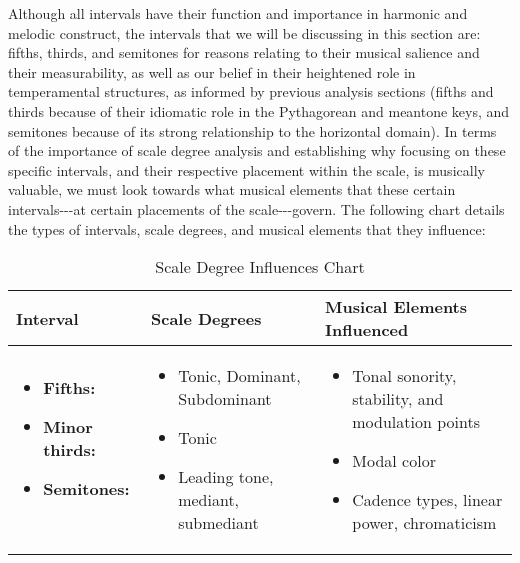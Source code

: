 Although all intervals have their function and importance in harmonic
and melodic construct, the intervals that we will be discussing in this
section are: fifths, thirds, and semitones for reasons relating to their
musical salience and their measurability, as well as our belief in their
heightened role in temperamental structures, as informed by previous
analysis sections (fifths and thirds because of their idiomatic role in
the Pythagorean and meantone keys, and semitones because of its strong
relationship to the horizontal domain). In terms of the importance of
scale degree analysis and establishing why focusing on these specific
intervals, and their respective placement within the scale, is musically
valuable, we must look towards what musical elements that these certain
intervals-\/-\/-at certain placements of the scale-\/-\/-govern. The
following chart details the types of intervals, scale degrees, and
musical elements that they influence:
\begin{table}[H]
\begin{singlespace}
\small
\centering
\begin{tabularx}{5.5in}{|>{\RaggedRight}X|>{\RaggedRight}X|>{\RaggedRight}X|}
\hline
\textbf{Interval} & \textbf{Scale Degrees} & \textbf{Musical Elements \newline Influenced} \\
\hline

\vspace{-1em}
\begin{itemize}[leftmargin=0cm]
    \item[] \textbf{Fifths: \newline~}
    \item[] \textbf{Minor thirds:}
    \item[] \textbf{Semitones: \newline~}
\end{itemize}
                  &

\vspace{-1em}
\begin{itemize}[leftmargin=*]
\item Tonic, Dominant, \newline Subdominant
\item Tonic
\item Leading tone, mediant, submediant
\end{itemize}
                  &
\vspace{-1em}
\begin{itemize}[leftmargin=*]
\item Tonal sonority, stability, \newline and modulation points
\item Modal color
\item Cadence types, linear power, chromaticism
\end{itemize}
\\

\hline
\end{tabularx}
\small
\end{singlespace}
\caption{Scale Degree Influences Chart}
\end{table}
